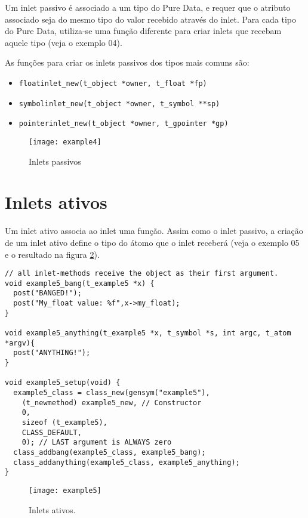 Um inlet passivo é associado a um tipo do Pure Data, e requer que o atributo
associado seja do mesmo tipo do valor recebido através do inlet. Para cada
tipo do Pure Data, utiliza-se uma função diferente para criar inlets que
recebam aquele tipo (veja o exemplo 04).

As funções para criar os inlets passivos dos tipos mais comuns são:

\begin{itemize}
\item \texttt{floatinlet\_new(t\_object *owner, t\_float *fp)}
\item \texttt{symbolinlet\_new(t\_object *owner, t\_symbol **sp)}
\item \texttt{pointerinlet\_new(t\_object *owner, t\_gpointer *gp)}
\end{itemize}

\begin{figure}[h!]
\centering
\texttt{[image: example4]}
\caption{Inlets passivos}
\label{fig:inlet-passivo}
\end{figure}

\section{Inlets ativos}

Um inlet ativo associa ao inlet uma função. Assim como o inlet passivo, a
criação de um inlet ativo define o tipo do átomo que o inlet receberá (veja o
exemplo 05 e o resultado na figura \ref{fig:inlet-ativo}).

\begin{lstlisting}
// all inlet-methods receive the object as their first argument.
void example5_bang(t_example5 *x) { 
  post("BANGED!");
  post("My_float value: %f",x->my_float);
}

void example5_anything(t_example5 *x, t_symbol *s, int argc, t_atom *argv){
  post("ANYTHING!");
}

void example5_setup(void) {
  example5_class = class_new(gensym("example5"),
    (t_newmethod) example5_new, // Constructor
    0, 
    sizeof (t_example5),
    CLASS_DEFAULT,
    0); // LAST argument is ALWAYS zero
  class_addbang(example5_class, example5_bang);
  class_addanything(example5_class, example5_anything);
}
\end{lstlisting}

\begin{figure}[h!]
\centering
\texttt{[image: example5]}
\caption{Inlets ativos.}
\label{fig:inlet-ativo}
\end{figure}

